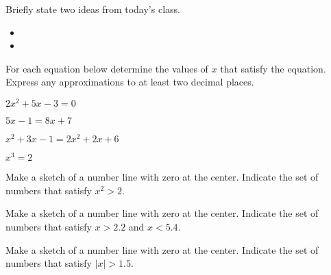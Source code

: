 \postClass

\begin{problem}
\item Briefly state two ideas from today's class.
  \begin{itemize}
  \item 
  \item 
  \end{itemize}
\item For each equation below determine the values of $x$ that satisfy
  the equation. Express any approximations to at least two decimal
  places.
  \begin{subproblem}
    \item $2x^2 + 5x - 3 = 0$
    \item $5x-1=8x+7$
    \item $x^2 + 3x - 1 = 2x^2 + 2x + 6$
    \item $x^3 = 2$
  \end{subproblem}
\item Make a sketch of a number line with zero at the center.
  Indicate the set of numbers that satisfy $x^2>2$.
\item Make a sketch of a number line with zero at the center.
  Indicate the set of numbers that satisfy $x>2.2$ and $x<5.4$.
\item Make a sketch of a number line with zero at the center.
  Indicate the set of numbers that satisfy $|x|>1.5$.
\end{problem}

